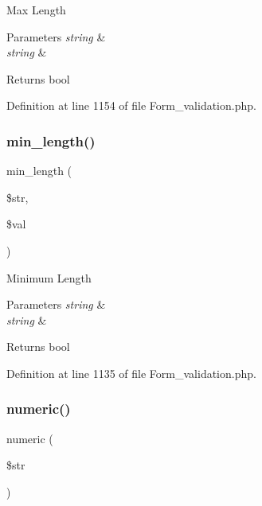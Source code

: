 Max Length


\begin{DoxyParams}{Parameters}
{\em string} & \\
\hline
{\em string} & \\
\hline
\end{DoxyParams}
\begin{DoxyReturn}{Returns}
bool 
\end{DoxyReturn}


Definition at line 1154 of file Form\+\_\+validation.\+php.

\mbox{\label{class_c_i___form__validation_a63a166f35fed88ec433fd2a37ec5ae90}} 
\subsubsection{\texorpdfstring{min\_length()}{min\_length()}}
{\footnotesize\ttfamily min\+\_\+length (\begin{DoxyParamCaption}\item[{}]{\$str,  }\item[{}]{\$val }\end{DoxyParamCaption})}

Minimum Length


\begin{DoxyParams}{Parameters}
{\em string} & \\
\hline
{\em string} & \\
\hline
\end{DoxyParams}
\begin{DoxyReturn}{Returns}
bool 
\end{DoxyReturn}


Definition at line 1135 of file Form\+\_\+validation.\+php.

\mbox{\label{class_c_i___form__validation_a058a2b065a28a929956630238d5bf5bb}} 
\subsubsection{\texorpdfstring{numeric()}{numeric()}}
{\footnotesize\ttfamily numeric (\begin{DoxyParamCaption}\item[{}]{\$str }\end{DoxyParamCaption})}

